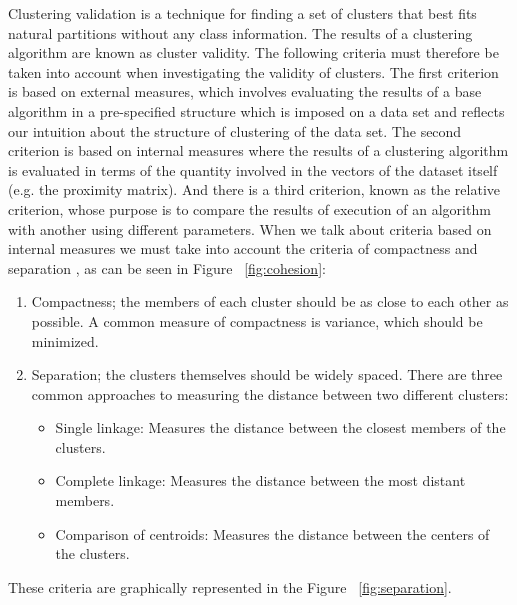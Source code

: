 Clustering validation is a technique for finding a set of clusters that best fits natural partitions without any class information. The results of a clustering algorithm are known as cluster validity. The following criteria must therefore be taken into account when investigating the validity of clusters. The first criterion is based on external measures, which involves evaluating the results of a base algorithm in a pre-specified structure which is imposed on a data set and reflects our intuition about the structure of clustering of the data set. The second criterion is based on internal measures where the results of a clustering algorithm is evaluated in terms of the quantity involved in the vectors of the dataset itself (e.g. the proximity matrix). And there is a third criterion, known as the relative criterion, whose purpose is to compare the results of execution of an algorithm with another using different parameters.
When we talk about criteria based on internal measures we must take into account the criteria of compactness and separation \citep{R:maria-yannis-michalis:2001} \citep{R:gordons-ja:2011}, as can be seen in Figure ~\ref{fig:cohesion}:
\begin{enumerate}
  \item Compactness; the members of each cluster should be as close to each other as possible. A common measure of compactness is variance, which should be minimized.
  \item Separation; the clusters themselves should be widely spaced. There are three common approaches to measuring the distance between two different clusters:
  \begin{itemize}
  \item Single linkage: Measures the distance between the closest members of the clusters.
  \item Complete linkage: Measures the distance between the most distant members.
  \item Comparison of centroids: Measures the distance between the centers of the clusters.
\end{itemize}
\end{enumerate}
These criteria are graphically represented in the Figure ~\ref{fig:separation}.

